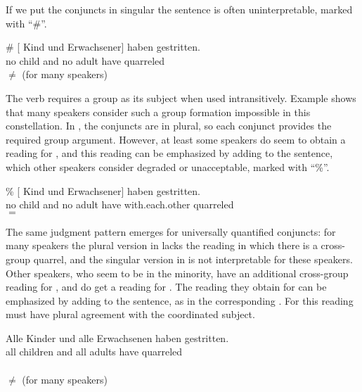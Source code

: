 \documentclass[output=paper]{langsci/langscibook}
\begin{document}
\begin{sloppypar}
  If we put the conjuncts in singular the sentence is often
  uninterpretable, marked with ``\#''.
\end{sloppypar}
\ea \label{ex-eltern2}
\gll \# [ Kind und  Erwachsener] haben gestritten.\\
{} \hphantom{[}no child and no adult have quarreled\\
\glt $\not=$  (for many speakers)
\z

The verb  requires a group as its subject when used intransitively. 
Example  shows that many speakers consider such a group formation impossible in this constellation. 
In , the conjuncts are in plural, so each conjunct provides the required group argument. However, at least some speakers do seem to obtain a reading for , and this reading can be emphasized by adding  to the sentence, which other speakers consider degraded or unacceptable, marked with ``\%''.

\ea \label{ex-eltern3}
\gll \% [ Kind und  Erwachsener] haben  gestritten.\\
{} \hphantom{[}no child and no adult have with.each.other quarreled\\
\glt $=$ 
\z

The same judgment pattern emerges for universally quantified conjuncts: for many speakers the plural version in  lacks the reading in which there is a cross-group quarrel, and the singular version in  is not interpretable for these speakers. Other speakers, who seem to be in the minority, have an additional cross-group reading for , and do get a reading for . The reading they obtain for  can be emphasized by adding  to the sentence, as in the corresponding . For this reading  must have plural agreement with the coordinated subject.

\ea \label{ex-eltern-all}
\gll Alle Kinder und alle Erwachsenen haben gestritten.\\
all children and all adults have quarreled\\
\glt {}\\
\glt $\not=$  (for many speakers)
\z 
\end{document}
